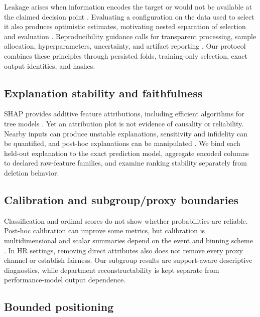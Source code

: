 \documentclass[information,article,submit,pdftex,moreauthors]{Definitions/mdpi}
\begin{document}
Leakage arises when information encodes the target or would not be available at the claimed decision point \cite{kaufman2012leakage,kapoor2023leakage}. Evaluating a configuration on the data used to select it also produces optimistic estimates, motivating nested separation of selection and evaluation \cite{cawley2010overfitting}. Reproducibility guidance calls for transparent processing, sample allocation, hyperparameters, uncertainty, and artifact reporting \cite{mitchell2019model,pineau2021improving}. Our protocol combines these principles through persisted folds, training-only selection, exact output identities, and hashes.

\subsection{Explanation stability and faithfulness}

SHAP provides additive feature attributions, including efficient algorithms for tree models \cite{lundberg2017unified,lundberg2020local}. Yet an attribution plot is not evidence of causality or reliability. Nearby inputs can produce unstable explanations, sensitivity and infidelity can be quantified, and post-hoc explanations can be manipulated \cite{alvarezmelis2018robustness,yeh2019infidelity,slack2020fooling}. We bind each held-out explanation to the exact prediction model, aggregate encoded columns to declared raw-feature families, and examine ranking stability separately from deletion behavior.

\subsection{Calibration and subgroup/proxy boundaries}

Classification and ordinal scores do not show whether probabilities are reliable. Post-hoc calibration can improve some metrics, but calibration is multidimensional and scalar summaries depend on the event and binning scheme \cite{guo2017calibration,vaicenavicius2019evaluating}. In HR settings, removing direct attributes also does not remove every proxy channel or establish fairness. Our subgroup results are support-aware descriptive diagnostics, while department reconstructability is kept separate from performance-model output dependence.

\subsection{Bounded positioning}
\end{document}
